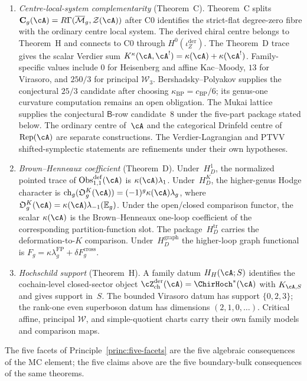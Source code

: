 \begin{conjecture}
\begin{enumerate}[label=\textup{(\Alph*)}]
\item \emph{Centre-local-system complementarity}
 \textup{(}Theorem~C\textup{)}.
 Theorem~C splits
 $\mathbf C_g(\cA)=R\Gamma(\overline{\mathcal M}_g,\mathcal Z(\cA))$
 after C0 identifies the strict-flat degree-zero fibre with the
 ordinary centre local system.  The derived chiral centre belongs to
 Theorem~H and connects to C0 through
 $H^0(\iota_Z^{\mathrm{der}})$.  The Theorem~D trace gives the scalar
 Verdier sum
 $K^\kappa(\cA,\cA^!)=\kappa(\cA)+\kappa(\cA^!)$. Family-specific
 values include $0$ for Heisenberg and affine Kac--Moody, $13$ for
 Virasoro, and $250/3$ for principal $\mathcal W_3$.
 Bershadsky--Polyakov supplies the conjectural $25/3$ candidate after
 choosing $\kappa_{\mathrm{BP}}=c_{\mathrm{BP}}/6$; its genus-one
 curvature computation remains an open obligation. The Mukai lattice supplies the conjectural
 $\mathsf B$-row candidate~$8$ under the five-part package stated
 below. The ordinary centre of~$\cA$ and the categorical Drinfeld
 centre of $\operatorname{Rep}(\cA)$ are separate constructions. The Verdier-Lagrangian
 and PTVV shifted-symplectic statements are refinements under their own
 hypotheses.

\item \emph{Brown--Henneaux coefficient}
 \textup{(}Theorem~D\textup{)}.
Under~$H_D^1$, the normalized pointed trace of
$\operatorname{Obs}^{\mathrm{def}}_{1,1}(\cA)$ is
$\kappa(\cA)\lambda_1$.  Under~$H_D^K$, the higher-genus Hodge
character is
$\operatorname{ch}_g(\mathfrak O_g^K(\cA))=
(-1)^g\kappa(\cA)\lambda_g$, where
$\mathfrak O_g^K(\cA)=\kappa(\cA)\lambda_{-1}(\mathbb E_g)$.
Under the open/closed comparison functor, the scalar $\kappa(\cA)$ is
the Brown--Henneaux one-loop coefficient of the corresponding
partition-function slot.  The package~$H_D^{\mathrm{tr}}$ carries the
deformation-to-$K$ comparison.  Under~$H_D^{\mathrm{graph}}$ the
higher-loop graph functional is
$F_g=\kappa\lambda_g^{\mathrm{FP}}+\delta F_g^{\mathrm{cross}}$.

\item \emph{Hochschild support}
 \textup{(}Theorem~H\textup{)}.
 A family datum $H_H(\cA;S)$ identifies the cochain-level
 closed-sector object
 $\cZ^{\mathrm{der}}_{\mathrm{ch}}(\cA)=\ChirHoch^*(\cA)$ with
 $K_{\cA,S}$ and gives support in~$S$.  The bounded Virasoro datum
 has support $\{0,2,3\}$; the rank-one even superboson datum has
 dimensions $(2,1,0,\ldots)$.  Critical affine, principal
 $\mathcal W$, and simple-quotient charts carry their own family
 models and comparison maps.
\end{enumerate}
The five facets of Principle~\ref{princ:five-facets} are the five
algebraic consequences of the MC element; the five claims above are
the five boundary-bulk consequences of the same theorems.
\end{conjecture}


